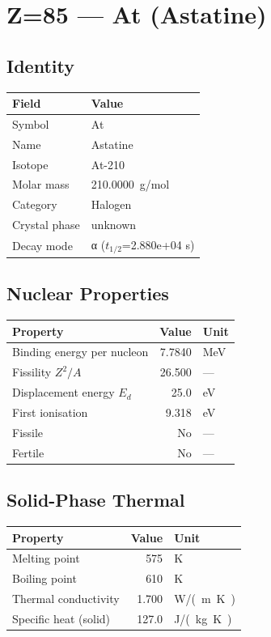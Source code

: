 \documentclass[11pt,a4paper]{article}
\begin{document}
\newpage

\section{Z=85 --- At (Astatine)}
\label{sec:Z85}

\subsection{Identity}
\begin{tabular}{ll}
  \toprule
  Field & Value \\
  \midrule
  Symbol & At \\
  Name & Astatine \\
  Isotope & At-210 \\
  Molar mass & \SI{210.0000}{g/mol} \\
  Category & Halogen \\
  Crystal phase & unknown \\
  Decay mode & α ($t_{1/2}$=2.880e+04 s) \\
  \bottomrule
\end{tabular}

\subsection{Nuclear Properties}
\begin{tabular}{lrl}
  \toprule
  Property & Value & Unit \\
  \midrule
  Binding energy per nucleon & 7.7840 & \si{MeV} \\
  Fissility $Z^2/A$ & 26.500 & --- \\
  Displacement energy $E_d$ & 25.0 & \si{eV} \\
  First ionisation & 9.318 & \si{eV} \\
  Fissile & No & --- \\
  Fertile & No & --- \\
  \bottomrule
\end{tabular}

\subsection{Solid-Phase Thermal}
\begin{tabular}{lrl}
  \toprule
  Property & Value & Unit \\
  \midrule
  Melting point & 575 & \si{K} \\
  Boiling point & 610 & \si{K} \\
  Thermal conductivity & 1.700 & \si{W/(m.K)} \\
  Specific heat (solid) & 127.0 & \si{J/(kg.K)} \\
  \bottomrule
\end{tabular}
\end{document}
